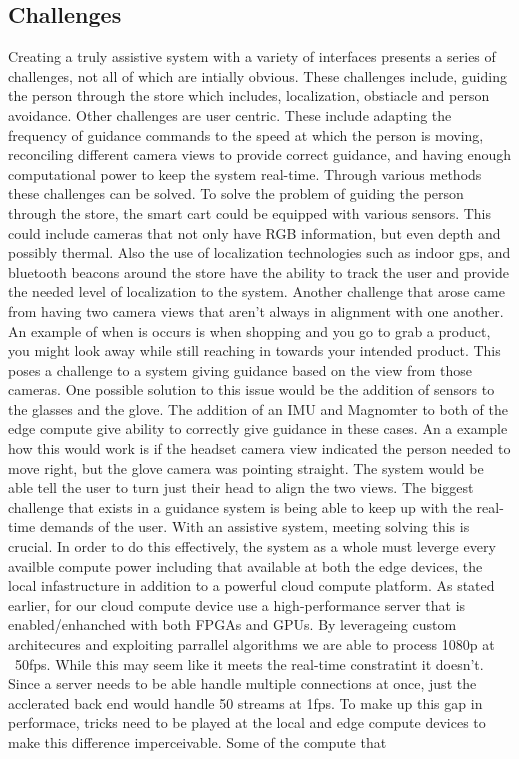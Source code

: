 \subsection{Challenges}
Creating a truly assistive system with a variety of interfaces presents a series 
of challenges, not all of which are intially obvious. These challenges include, guiding the person
through the store which includes, localization, obstiacle and person avoidance. Other challenges are
user centric. These include adapting the frequency of guidance commands to the speed at which the person is moving, 
reconciling different camera views to provide correct guidance, and having enough computational power to keep the system real-time. 
Through various methods these challenges can be solved. To solve the problem of guiding the person through the store, the smart cart could be equipped with various sensors. This could include cameras that not only have RGB information, but even depth and possibly thermal. Also the use of
localization technologies such as indoor gps, and bluetooth beacons around the store have the ability to track the user and provide the needed level of localization to the system.
Another challenge that arose came from having two camera views that aren't always in alignment with one another. An example of when is occurs is when shopping and you go to grab a product, you might look away while still reaching in towards your intended product. This poses a challenge to a system giving guidance based on the view from those cameras. One possible solution to this issue would be the addition of sensors to the glasses and the glove. The addition of an IMU and Magnomter to both of the edge compute give ability to correctly give guidance in these cases. An a example how this would work is if the headset camera view indicated the person needed to move right, but the glove camera was pointing straight. The system would be able tell the user to turn just their head to align the two views.
The biggest challenge that exists in a guidance system is being able to keep up with the real-time demands of the user. With an assistive system, meeting solving this is crucial. In order to do this effectively, the system as a whole must leverge every availble compute power including that available at both the edge devices, the local infastructure in addition to a powerful cloud compute platform. As stated earlier, for our cloud compute device use a high-performance server that is enabled/enhanched with both FPGAs and GPUs. By leverageing custom architecures and exploiting parrallel algorithms we are able to process 1080p at ~50fps. While this may seem like it meets the real-time constratint it doesn't. Since a server needs to be able handle multiple connections at once, just the acclerated back end would handle 50 streams at 1fps. To make up this gap in performace, tricks need to be played at the local and edge compute devices to make this difference imperceivable. Some of the compute that 





